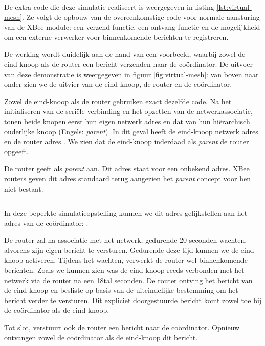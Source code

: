 De extra code die deze simulatie realiseert is weergegeven in listing
\ref{lst:virtual-mesh}. Ze volgt de opbouw van de overeenkomstige code voor
normale aansturing van de XBee module: een verzend functie, een ontvang functie
en de mogelijkheid om een externe verwerker voor binnenkomende berichten te
registreren.

De werking wordt duidelijk aan de hand van een voorbeeld, waarbij zowel de
eind-knoop als de router een bericht verzenden naar de co\"ordinator. De
uitvoer van deze demonstratie is weergegeven in figuur \ref{fig:virtual-mesh}:
van boven naar onder zien we de uitvier van de eind-knoop, de router en de
co\"ordinator.

Zowel de eind-knoop als de router gebruiken exact dezelfde code. Na het
initialiseren van de seri\"ele verbinding en het opzetten van de
netwerkassociatie, tonen beide knopen eerst hun eigen netwerk adres en dat van
hun hi\"erarchisch ouderlijke knoop (Engels: \emph{parent}). In dit geval heeft
de eind-knoop netwerk adres  en de router adres . We zien
dat de eind-knoop inderdaad als \emph{parent} de router opgeeft.

De router geeft als \emph{parent}  aan. Dit adres staat voor een
onbekend adres. XBee routers geven dit adres standaard terug aangezien het
\emph{parent} concept voor hen niet bestaat. 

\inputminted[linenos,frame=lines,framesep=2mm,fontsize=\footnotesize,firstline=39, firstnumber=39]{c}{../src/demo/lib/network.c}
\vspace{-5mm}
\vspace{3mm}

In deze beperkte simulatieopstelling kunnen we dit adres gelijkstellen aan het
adres van de co\"ordinator: .

De router zal na associatie met het netwerk, gedurende 20 seconden wachten,
alvorens zijn eigen bericht te versturen. Gedurende deze tijd kunnen we de
eind-knoop activeren. Tijdens het wachten, verwerkt de router wel binnenkomende
berichten. Zoals we kunnen zien was de eind-knoop reeds verbonden met het
netwerk via de router na een 18tal seconden. De router ontving het bericht van
de eind-knoop en besliste op basis van de uiteindelijke bestemming om het
bericht verder te versturen. Dit expliciet doorgestuurde bericht komt zowel toe
bij de co\"ordinator als de eind-knoop.

Tot slot, verstuurt ook de router een bericht naar de co\"ordinator. Opnieuw
ontvangen zowel de co\"ordinator als de eind-knoop dit bericht.

